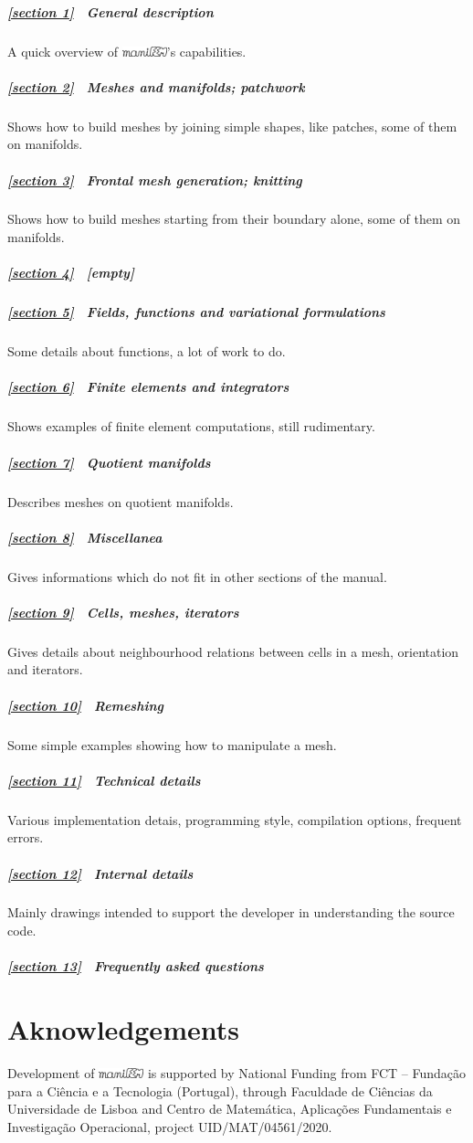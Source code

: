 \documentclass[a4paper]{scrreprt}
\def\numb{}
\newcommand\maniFEM{\leavevmode\hbox{\includegraphics[width=13mm]{manifem-small}}}
\newcommand\cinzasec[1]{\textcolor{comentsec}{#1}}
\begin{document}
\subparagraph*{\ref{\numb section 1} \ General description}
A quick overview of \maniFEM's capabilities.

\subparagraph*{\ref{\numb section 2} \ Meshes and manifolds; patchwork}
Shows how to build meshes by joining simple shapes, like patches, some of them on manifolds.

\subparagraph*{\ref{\numb section 3} \ Frontal mesh generation; knitting}
Shows how to build meshes starting from their boundary alone, some of them on manifolds.

\subparagraph*{\ref{\numb section 4} \ \cinzasec{[empty]}}

\subparagraph*{\ref{\numb section 5} \ Fields, functions and variational formulations}
Some details about functions, a lot of work to do.

\subparagraph*{\ref{\numb section 6} \ Finite elements and integrators}
Shows examples of finite element computations, still rudimentary.

\subparagraph*{\ref{\numb section 7} \ Quotient manifolds}
Describes meshes on quotient manifolds.

\subparagraph*{\ref{\numb section 8} \ Miscellanea}
Gives informations which do not fit in other sections of the manual.

\subparagraph*{\ref{\numb section 9} \ Cells, meshes, iterators}
Gives details about neighbourhood relations between cells in a mesh, orientation and iterators.

\subparagraph*{\ref{\numb section 10} \ Remeshing}
Some simple examples showing how to manipulate a mesh.

\subparagraph*{\ref{\numb section 11} \ Technical details}
Various implementation detais, programming style, compilation options, frequent errors.

\subparagraph*{\ref{\numb section 12} \ Internal details}
Mainly drawings intended to support the developer in understanding the source code.

\subparagraph*{\ref{\numb section 13} \ Frequently asked questions} \hglue 2cm
\vfil\eject


\section*{Aknowledgements}

Development of {\maniFEM} is supported by National Funding from FCT -- Funda\c c\~ao
para a Ci\^encia e a Tecnologia (Portugal), through Faculdade de Ci\^encias da Universidade
de Lisboa and Centro de Matem\'atica, Aplica\c c\~oes Fundamentais e Investiga\c c\~ao
Operacional, project UID/MAT/04561/2020.
\end{document}
